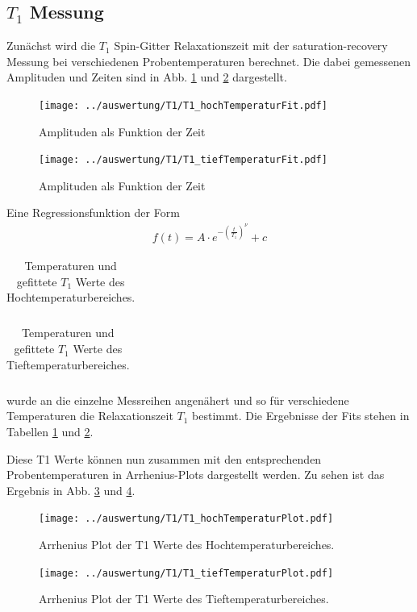 \subsection{$T_1$ Messung}
Zunächst wird die $T_1$ Spin-Gitter Relaxationszeit mit der saturation-recovery Messung bei verschiedenen Probentemperaturen berechnet. Die dabei gemessenen Amplituden und Zeiten sind in Abb. \ref{pic_T1_hoch} und \ref{pic_T1_tief} dargestellt. 
\begin{figure}[htbp]
	\texttt{[image: ../auswertung/T1/T1\_hochTemperaturFit.pdf]}
	\caption{Amplituden als Funktion der Zeit}
	\label{pic_T1_hoch}
\end{figure}
\begin{figure}[htbp]
	\texttt{[image: ../auswertung/T1/T1\_tiefTemperaturFit.pdf]}
	\caption{Amplituden als Funktion der Zeit}
	\label{pic_T1_tief}
\end{figure}

Eine Regressionsfunktion der Form 
\begin{align}
	f(t) = A\cdot e^{-\left(\frac{t}{T_1}\right)^\nu}+c
\end{align}
\begin{table}[htbp]
	\begin{tabular}{| >{$}c<{$} | >{$}c<{$} | >{$}c<{$} |}
		
	\end{tabular}
	\caption{Temperaturen und gefittete $T_1$ Werte des Hochtemperaturbereiches.}
	\label{tab:T1_hoch}
\end{table}
\begin{table}[htbp]
	\begin{tabular}{| >{$}c<{$} | >{$}c<{$} | >{$}c<{$} |}
		
	\end{tabular}
	\caption{Temperaturen und gefittete $T_1$ Werte des Tieftemperaturbereiches.}
	\label{tab:T1_tief}
\end{table}
wurde an die einzelne Messreihen angenähert und so für verschiedene Temperaturen die Relaxationszeit $T_1$ bestimmt. Die Ergebnisse der Fits stehen in Tabellen \ref{tab:T1_hoch} und \ref{tab:T1_tief}.

Diese T1 Werte können nun zusammen mit den entsprechenden Probentemperaturen in Arrhenius-Plots dargestellt werden. Zu sehen ist das Ergebnis in Abb. \ref{pic_T1Arr_hoch} und \ref{pic_T1Arr_tief}.
\begin{figure}[htbp]
	\texttt{[image: ../auswertung/T1/T1\_hochTemperaturPlot.pdf]}
	\caption{Arrhenius Plot der T1 Werte des Hochtemperaturbereiches.}
	\label{pic_T1Arr_hoch}
\end{figure}
\begin{figure}[htbp]
	\texttt{[image: ../auswertung/T1/T1\_tiefTemperaturPlot.pdf]}
	\caption{Arrhenius Plot der T1 Werte des Tieftemperaturbereiches.}
	\label{pic_T1Arr_tief}
\end{figure}

